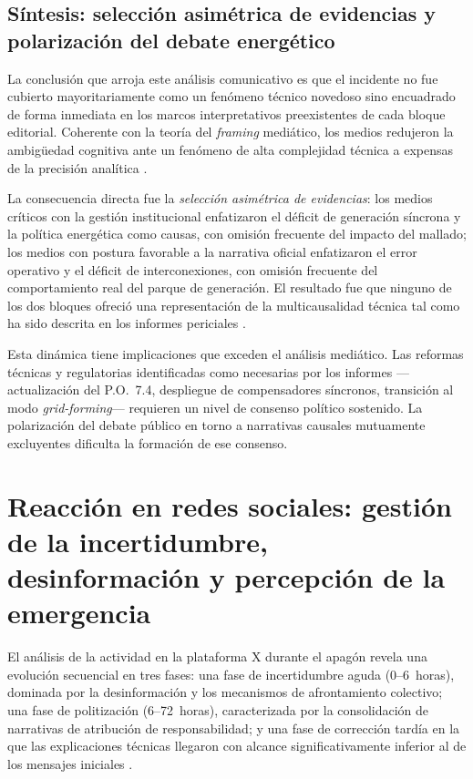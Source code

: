 \subsection*{Síntesis: selección asimétrica de evidencias y
polarización del debate energético}

La conclusión que arroja este análisis comunicativo es que el
incidente no fue cubierto mayoritariamente como un fenómeno técnico
novedoso sino encuadrado de forma inmediata en los marcos
interpretativos preexistentes de cada bloque editorial. Coherente
con la teoría del \textit{framing} mediático, los medios redujeron
la ambigüedad cognitiva ante un fenómeno de alta complejidad técnica
a expensas de la precisión analítica \cite{mitceepr2025}.

La consecuencia directa fue la \textit{selección asimétrica de
evidencias}: los medios críticos con la gestión institucional
enfatizaron el déficit de generación síncrona y la política energética
como causas, con omisión frecuente del impacto del mallado; los medios
con postura favorable a la narrativa oficial enfatizaron el error
operativo y el déficit de interconexiones, con omisión frecuente del
comportamiento real del parque de generación. El resultado fue que
ninguno de los dos bloques ofreció una representación de la
multicausalidad técnica tal como ha sido descrita en los informes
periciales \cite{icai2025,gobierno2025}.

Esta dinámica tiene implicaciones que exceden el análisis mediático.
Las reformas técnicas y regulatorias identificadas como necesarias por
los informes ---actualización del P.O.~7.4, despliegue de
compensadores síncronos, transición al modo \textit{grid-forming}---
requieren un nivel de consenso político sostenido. La polarización del
debate público en torno a narrativas causales mutuamente excluyentes
dificulta la formación de ese consenso.

\section{Reacción en redes sociales: gestión de la incertidumbre,
desinformación y percepción de la emergencia}
\label{sec:redes_sociales}

El análisis de la actividad en la plataforma X durante el apagón
revela una evolución secuencial en tres fases: una fase de
incertidumbre aguda (0--6~horas), dominada por la desinformación y los
mecanismos de afrontamiento colectivo; una fase de politización
(6--72~horas), caracterizada por la consolidación de narrativas de
atribución de responsabilidad; y una fase de corrección tardía en la
que las explicaciones técnicas llegaron con alcance significativamente
inferior al de los mensajes iniciales \cite{mitceepr2025}.

